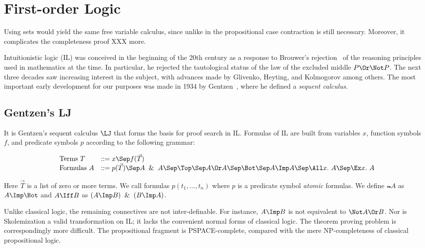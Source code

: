 
\chapter{First-order Logic}\label{chapter.fol}

\begin{remark}\label{fol.remark.multiset}
Using sets would yield the same free variable calculus, since
unlike in the propositional case contraction is still necessary.
Moreover, it complicates the completeness proof XXX more.
\end{remark}

Intuitionistic logic (IL) was conceived in the beginning of the 20th century as a
response to Brouwer's rejection~\cite{Brouwer.1907.Thesis} of the reasoning
principles used in mathematics at the time.  In particular, he rejected the
tautological status of the law of the excluded middle $P\Or\Not P$.  The next
three decades saw increasing interest in the subject, with advances made by
Glivenko, Heyting, and Kolmogorov among others.  The most important early
development for our purposes was made in 1934 by Gentzen~\cite{Gentzen.1934.MZ},
where he defined a \emph{sequent calculus}.

\section{Gentzen's LJ}

It is Gentzen's sequent calculus $\LJ$ that forms the basis for proof search
in IL.  Formulas of IL are built from variables $x$, function symbols $f$,
and predicate symbols $p$ according to the following grammar:

\[
\begin{array}{lll}
  &\mbox{Terms } T &::= x \Sep f(\vec{T})\\
  &\mbox{Formulas } A &::= p(\vec{T}) \Sep A \And A \Sep \Top \Sep A \Or A
  \Sep \Bot \Sep A \Imp A \Sep \All x.\ A \Sep \Ex x.\ A\\
\end{array}
\]




Here $\vec{T}$ is a list of zero or more terms.  We call formulas $p(t_1,
\ldots, t_n)$ where $p$ is a predicate symbol \emph{atomic} formulas.
We define $\Not A$ as $A\Imp\Bot$ and $A \Iff B$ as $(A\Imp B)
\And (B\Imp A)$.

\begin{remark}
Unlike classical logic, the remaining connectives are not
inter-definable.  For instance, $A\Imp B$ is not equivalent to $\Not A\Or B$.
Nor is Skolemization a valid transformation on IL; it lacks the convenient
normal forms of classical logic.  The theorem proving problem is correspondingly
more difficult.  The propositional fragment is PSPACE-complete,
compared with the mere NP-completeness of classical propositional logic.
\end{remark}

